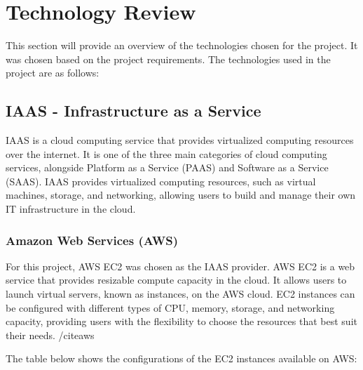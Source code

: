 \setlength{\headheight}{15pt}
\addtolength{\topmargin}{-2.5pt}

\chapter{Technology Review}
This section will provide an overview of the technologies chosen for the project. It was chosen based on the project requirements. 
The technologies used in the project are as follows:


\section{IAAS - Infrastructure as a Service}
IAAS is a cloud computing service that provides virtualized computing resources over the internet. It is one of the three main categories of cloud computing 
services, alongside Platform as a Service (PAAS) and Software as a Service (SAAS). IAAS provides virtualized computing resources, such as virtual machines, 
storage, and networking, allowing users to build and manage their own IT infrastructure in the cloud.

\subsection{Amazon Web Services (AWS)}
For this project, AWS EC2 was chosen as the IAAS provider. AWS EC2 is a web service that provides resizable compute capacity in the cloud. It allows users to
launch virtual servers, known as instances, on the AWS cloud. EC2 instances can be configured with different types of CPU, memory, storage, and networking capacity,
providing users with the flexibility to choose the resources that best suit their needs. /cite{aws} 

The table below shows the configurations of the EC2 instances available on AWS\cite{aws}:


